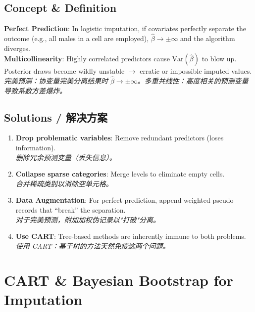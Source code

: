 \documentclass[9pt, a4paper]{article}
\begin{document}
\subsection{Concept \& Definition}
\begin{tcolorbox}[defbox]
    \textbf{Perfect Prediction}: In logistic imputation, if covariates perfectly separate the outcome (e.g., all males in a cell are employed), $\hat{\beta} \to \pm\infty$ and the algorithm diverges.\\[3pt]
    \textbf{Multicollinearity}: Highly correlated predictors cause $\text{Var}(\hat{\beta})$ to blow up. Posterior draws become wildly unstable $\to$ erratic or impossible imputed values.\\
    \textit{完美预测：协变量完美分离结果时 $\hat{\beta} \to \pm\infty$。多重共线性：高度相关的预测变量导致系数方差爆炸。}
\end{tcolorbox}

\subsection{Solutions / 解决方案}
\begin{enumerate}
    \item \textbf{Drop problematic variables}: Remove redundant predictors (loses information).\\
    \textit{删除冗余预测变量（丢失信息）。}
    \item \textbf{Collapse sparse categories}: Merge levels to eliminate empty cells.\\
    \textit{合并稀疏类别以消除空单元格。}
    \item \textbf{Data Augmentation}: For perfect prediction, append weighted pseudo-records that ``break'' the separation.\\
    \textit{对于完美预测，附加加权伪记录以"打破"分离。}
    \item \textbf{Use CART}: Tree-based methods are inherently immune to both problems.\\
    \textit{使用 CART：基于树的方法天然免疫这两个问题。}
\end{enumerate}

\section{CART \& Bayesian Bootstrap for Imputation}
\end{document}
